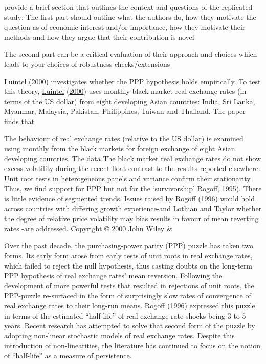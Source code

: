 \documentclass[11pt,preprint, authoryear]{elsarticle}
\numberwithin{equation}{section}
\numberwithin{figure}{section}
\numberwithin{table}{section}
\begin{document}
provide a brief section that outlines the context and questions of the
replicated study: The first part should outline what the authors do, how
they motivate the question as of economic interest and/or importance,
how they motivate their methods and how they argue that their
contribution is novel

The second part can be a critical evaluation of their approach and
choices which leads to your choices of robustness checks/extensions

\protect\hyperlink{ref-Kul}{Luintel} (\protect\hyperlink{ref-Kul}{2000})
investigates whether the PPP hypothesis holds empirically. To test this
theory, \protect\hyperlink{ref-Kul}{Luintel}
(\protect\hyperlink{ref-Kul}{2000}) uses monthly black market real
exchange rates (in terms of the US dollar) from eight developing Asian
countries: India, Sri Lanka, Myanmar, Malaysia, Pakistan, Philippines,
Taiwan and Thailand. The paper finds that

The behaviour of real exchange rates (relative to the US dollar) is
examined using monthly from the black markets for foreign exchange of
eight Asian developing countries. The data The black market real
exchange rates do not show excess volatility during the recent float
contrast to the results reported elsewhere. Unit root tests in
heterogeneous panels and variance confirm their stationarity. Thus, we
find support for PPP but not for the `survivorship' Rogoff, 1995). There
is little evidence of segmented trends. Issues raised by Rogoff (1996)
would hold across countries with differing growth experience-and Lothian
and Taylor whether the degree of relative price volatility may bias
results in favour of mean reverting rates -are addressed. Copyright ©
2000 John Wiley \&

Over the past decade, the purchasing-power parity (PPP) puzzle has taken
two forms. Its early form arose from early tests of unit roots in real
exchange rates, which failed to reject the null hypothesis, thus casting
doubts on the long-term PPP hypothesis of real exchange rates' mean
reversion. Following the development of more powerful tests that
resulted in rejections of unit roots, the PPP-puzzle re-surfaced in the
form of surprisingly slow rates of convergence of real exchange rates to
their long-run means. Rogoff (1996) expressed this puzzle in terms of
the estimated ``half-life'' of real exchange rate shocks being 3 to 5
years. Recent research has attempted to solve that second form of the
puzzle by adopting non-linear stochastic models of real exchange rates.
Despite this introduction of non-linearities, the literature has
continued to focus on the notion of ``half-life'' as a measure of
persistence.
\end{document}
